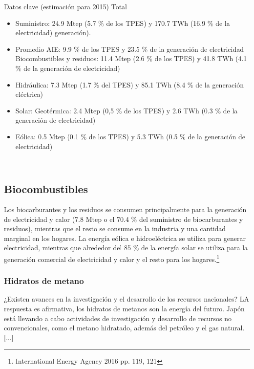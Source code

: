 \documentclass[]{article}
\begin{document}
Datos clave (estimación para 2015) Total\\

\begin{itemize}
	\item Suministro: 24.9 Mtep (5.7 $\%$ de los TPES) y 170.7 TWh (16.9 $\%$ de la electricidad)
	generación). 
	\item Promedio AIE: 9.9 $\%$ de los TPES y 23.5 $\%$ de la generación de electricidad Biocombustibles y residuos: 11.4 Mtep (2.6 $\%$ de los TPES) y 41.8 TWh (4.1 $\%$ de la generación de electricidad) 
	\item Hidráulica: 7.3 Mtep (1.7 $\%$ del TPES) y 85.1 TWh (8.4 $\%$ de la generación eléctrica) 
	\item Solar: Geotérmica: 2.4 Mtep (0,5 $\%$ de los TPES) y 2.6 TWh (0.3 $\%$ de la generación de electricidad) 
	\item Eólica: 0.5 Mtep (0.1 $\%$ de los TPES) y 5.3 TWh (0.5 $\%$ de la generación de electricidad)	 
\end{itemize}
\citep{InternationalEnergyAgency2016}\\

\subsection{Biocombustibles}

Los biocarburantes y los residuos se consumen principalmente para la generación de electricidad y calor (7.8 Mtep o el 70.4 $\%$ del suministro de biocarburantes y residuos), mientras que el resto se consume en la industria y una cantidad marginal en los hogares. La energía eólica e hidroeléctrica se utiliza para generar electricidad, mientras que alrededor del 85 $\%$ de la energía solar se utiliza para la generación comercial de electricidad y calor y el resto para los hogares.\citep{InternationalEnergyAgency2016}\footnote{International Energy Agency 2016 pp. 119, 121}\\

\subsubsection{Hidratos de metano}

¿Existen avances en la investigación y el desarrollo de los recursos nacionales? LA respuesta es afirmativa, los hidratos de metanos son la energía del futuro. Japón está llevando a cabo actividades de investigación y desarrollo de recursos no convencionales, como el metano hidratado, además del petróleo y el gas natural.[...]\\
\end{document}
